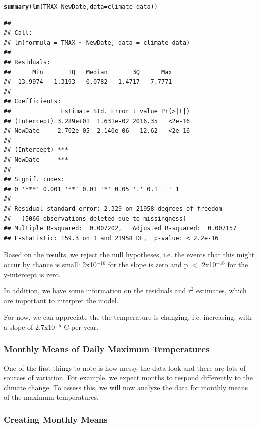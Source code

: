 \documentclass{article}\usepackage[]{graphicx}\usepackage[]{color}
\makeatletter
\newcommand{\hlopt}[1]{\textcolor[rgb]{0,0,0}{#1}}%
\newcommand{\hlstd}[1]{\textcolor[rgb]{0.345,0.345,0.345}{#1}}%
\newcommand{\hlkwc}[1]{\textcolor[rgb]{0.333,0.667,0.333}{#1}}%
\newcommand{\hlkwd}[1]{\textcolor[rgb]{0.737,0.353,0.396}{\textbf{#1}}}%
\newenvironment{kframe}{%
 \def\at@end@of@kframe{}%
 \ifinner\ifhmode%
  \def\at@end@of@kframe{\end{minipage}}%
  \begin{minipage}{\columnwidth}%
 \fi\fi%
 \def\FrameCommand##1{\hskip\@totalleftmargin \hskip-\fboxsep
 \colorbox{shadecolor}{##1}\hskip-\fboxsep
     \hskip-\linewidth \hskip-\@totalleftmargin \hskip\columnwidth}%
 \MakeFramed {\advance\hsize-\width
   \@totalleftmargin\z@ \linewidth\hsize
   \@setminipage}}%
 {\par\unskip\endMakeFramed%
 \at@end@of@kframe}
\newenvironment{knitrout}{}{} %
\makeatother
\begin{document}
\begin{knitrout}
\color{fgcolor}\begin{kframe}
\begin{alltt}
\hlkwd{summary}\hlstd{(}\hlkwd{lm}\hlstd{(TMAX} \hlopt{~} \hlstd{NewDate,} \hlkwc{data}\hlstd{=climate_data))}
\end{alltt}
\begin{verbatim}
## 
## Call:
## lm(formula = TMAX ~ NewDate, data = climate_data)
## 
## Residuals:
##      Min       1Q   Median       3Q      Max 
## -13.9974  -1.3193   0.0782   1.4717   7.7771 
## 
## Coefficients:
##              Estimate Std. Error t value Pr(>|t|)
## (Intercept) 3.289e+01  1.631e-02 2016.35   <2e-16
## NewDate     2.702e-05  2.140e-06   12.62   <2e-16
##                
## (Intercept) ***
## NewDate     ***
## ---
## Signif. codes:  
## 0 '***' 0.001 '**' 0.01 '*' 0.05 '.' 0.1 ' ' 1
## 
## Residual standard error: 2.329 on 21958 degrees of freedom
##   (5066 observations deleted due to missingness)
## Multiple R-squared:  0.007202,	Adjusted R-squared:  0.007157 
## F-statistic: 159.3 on 1 and 21958 DF,  p-value: < 2.2e-16
\end{verbatim}
\end{kframe}
\end{knitrout}

Based on the results, we reject the null hypotheses, i.e. the events that this might occur by chance is small: 2x10$^{-16}$ for the slope is zero and p $<$ 2x10$^{-16}$ for the y-intercept is zero. 

In addition, we have some information on the residuals and r$^2$ estimates, which are important to interpret the model. 

For now, we can appreciate the the temperature is changing, i.e. increasing, with a slope of 2.7x10$^{-5}$ \degree C per year. 

\subsubsection{Monthly Means of Daily Maximum Temperatures}

One of the first things to note is how messy the data look and there are lots of sources of variation. For example, we expect months to respond differently to the climate change. To assess this, we will now analyze the data for monthly means of the maximum temperatures.

\subsubsection{Creating Monthly Means}
\end{document}
